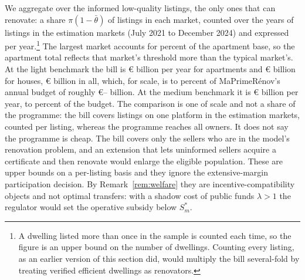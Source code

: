 We aggregate over the informed low-quality listings, the only ones that can renovate: a share $\pi(1-\bar\theta)$ of listings in each market, counted over the \attSampleYears{} years of listings in the estimation markets (July 2021 to December 2024) and expressed per year.\footnote{A dwelling listed more than once in the sample is counted each time, so the figure is an upper bound on the number of dwellings. Counting every listing, as an earlier version of this section did, would multiply the bill several-fold by treating verified efficient dwellings as renovators.} The largest market accounts for \attTopMarketShareApt{} percent of the apartment base, so the apartment total reflects that market's threshold more than the typical market's. At the light benchmark the bill is \euro{}\attScBaseCostTwoFiftyApt{} billion per year for apartments and \euro{}\attScBaseCostTwoFiftyHouse{} billion for houses, \euro{}\attScCostBaseTotTwoFifty{} billion in all, which, for scale, is \attScCostBaseTotTwoFiftyLo{} to \attScCostBaseTotTwoFiftyHi{} percent of MaPrimeR\'enov's annual budget of roughly \euro{}\attBudgetLo{}--\attBudgetHi{} billion. %
At the medium benchmark it is \euro{}\attScCostBaseTotFiveHundred{} billion per year, \attScCostBaseTotFiveHundredLo{} to \attScCostBaseTotFiveHundredHi{} percent of the budget. The comparison is one of scale and not a share of the programme: the bill covers listings on one platform in the estimation markets, counted per listing, whereas the programme reaches all owners. It does not say the programme is cheap. The bill covers only the sellers who are in the model's renovation problem, and an extension that lets uninformed sellers acquire a certificate and then renovate would enlarge the eligible population. These are upper bounds on a per-listing basis and they ignore the extensive-margin participation decision. By Remark~\ref{rem:welfare} they are incentive-compatibility objects and not optimal transfers: with a shadow cost of public funds $\lambda>1$ the regulator would set the operative subsidy below $S^*_m$.
